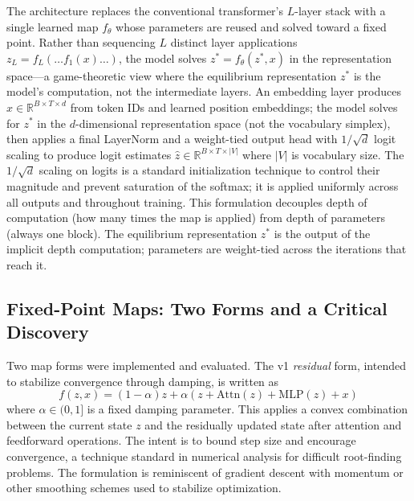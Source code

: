 


The \EqLM{} architecture replaces the conventional transformer's $L$-layer stack with a single learned map $f_\theta$ whose parameters are reused and solved toward a fixed point. Rather than sequencing $L$ distinct layer applications $z_L = f_L(\ldots f_1(x)\ldots)$, the model solves $z^* = f_\theta(z^*, x)$ in the representation space---a game-theoretic view where the equilibrium representation $z^*$ is the model's computation, not the intermediate layers. An embedding layer produces $x \in \mathbb{R}^{B \times T \times d}$ from token IDs and learned position embeddings; the model solves for $z^*$ in the $d$-dimensional representation space (not the vocabulary simplex), then applies a final LayerNorm and a weight-tied output head with $1/\sqrt{d}$ logit scaling to produce logit estimates $\hat{z} \in \mathbb{R}^{B \times T \times |V|}$ where $|V|$ is vocabulary size. The $1/\sqrt{d}$ scaling on logits is a standard initialization technique to control their magnitude and prevent saturation of the softmax; it is applied uniformly across all outputs and throughout training. This formulation decouples depth of computation (how many times the map is applied) from depth of parameters (always one block). The equilibrium representation $z^*$ is the output of the implicit depth computation; parameters are weight-tied across the iterations that reach it.

\subsection*{Fixed-Point Maps: Two Forms and a Critical Discovery}

Two map forms were implemented and evaluated. The v1 \emph{residual} form, intended to stabilize convergence through damping, is written as
\begin{equation}
f(z, x) = (1-\alpha)z + \alpha(z + \mathrm{Attn}(z) + \mathrm{MLP}(z) + x)
\label{eq:v1_map}
\end{equation}
where $\alpha \in (0, 1]$ is a fixed damping parameter. This applies a convex combination between the current state $z$ and the residually updated state after attention and feedforward operations. The intent is to bound step size and encourage convergence, a technique standard in numerical analysis for difficult root-finding problems. The formulation is reminiscent of gradient descent with momentum or other smoothing schemes used to stabilize optimization.

